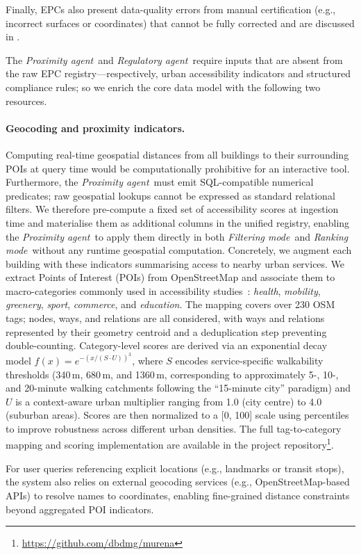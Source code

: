 \documentclass[runningheads,orivec]{llncs}
\newcommand{\code}{\url{https://github.com/dbdmg/murena}}
\newcommand{\proximityagent}{\textit{Proximity agent}}
\newcommand{\regulatoryagent}{\textit{Regulatory agent}}
\newcommand{\filteringmode}{\textit{Filtering mode}}
\newcommand{\rankingmode}{\textit{Ranking mode}}
\begin{document}
Finally, EPCs also present data-quality errors from manual certification (e.g., incorrect surfaces or coordinates) that cannot be fully corrected and are discussed in .

The \proximityagent\ and \regulatoryagent\ require inputs that are absent from the raw EPC registry—respectively, urban accessibility indicators and structured compliance rules; so we enrich the core data model with the following two resources.

\paragraph{Geocoding and proximity indicators.}
Computing real-time geospatial distances from all buildings to their surrounding POIs at query time would be computationally prohibitive for an interactive tool.
Furthermore, the \proximityagent\ must emit SQL-compatible numerical predicates; raw geospatial lookups cannot be expressed as standard relational filters.
We therefore pre-compute a fixed set of accessibility scores at ingestion time and materialise them as additional columns in the unified registry, enabling the \proximityagent\ to apply them directly in both \filteringmode\ and \rankingmode\ without any runtime geospatial computation.
Concretely, we augment each building with these indicators summarising access to nearby urban services.
We extract Points of Interest (POIs) from OpenStreetMap and associate them to macro-categories commonly used in accessibility studies~\cite{shi2025impacts}: \textit{health}, \textit{mobility}, \textit{greenery}, \textit{sport}, \textit{commerce}, and \textit{education}.
The mapping covers over 230 OSM tags; nodes, ways, and relations are all considered, with ways and relations represented by their geometry centroid and a deduplication step preventing double-counting.
Category-level scores are derived via an exponential decay model $f(x) = e^{-(x / (S \cdot U))^3}$, where $S$ encodes service-specific walkability thresholds (340\,m, 680\,m, and 1360\,m, corresponding to approximately 5-, 10-, and 20-minute walking catchments following the ``15-minute city'' paradigm) and $U$ is a context-aware urban multiplier ranging from 1.0 (city centre) to 4.0 (suburban areas).
Scores are then normalized to a [0, 100] scale using percentiles to improve robustness across different urban densities.
The full tag-to-category mapping and scoring implementation are available in the project repository\footnote{\code}.

For user queries referencing explicit locations (e.g., landmarks or transit stops), the system also relies on external geocoding services (e.g., OpenStreetMap-based APIs) to resolve names to coordinates, enabling fine-grained distance constraints beyond aggregated POI indicators.
\end{document}
